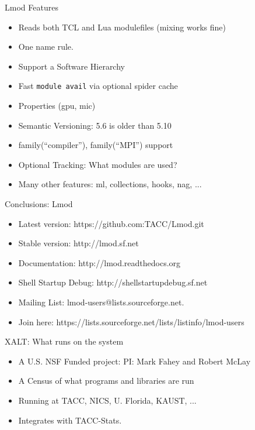 \documentclass{beamer}
\begin{document}
\begin{frame}{Lmod Features}
  \begin{itemize}
    \item Reads both TCL and Lua modulefiles (mixing works fine)
    \item One name rule.
    \item Support a Software Hierarchy
    \item Fast \texttt{module avail} via optional spider cache 
    \item Properties (gpu, mic)
    \item Semantic Versioning:  5.6 is older than 5.10
    \item family(``compiler''), family(``MPI'') support
    \item Optional Tracking: What modules are used?
    \item Many other features: ml, collections, hooks, nag, ...
  \end{itemize}
\end{frame}

\begin{frame}{Conclusions: Lmod}
  \begin{itemize}
    \item Latest version: https://github.com:TACC/Lmod.git
    \item Stable version: http://lmod.sf.net
    \item Documentation:  http://lmod.readthedocs.org
    \item Shell Startup Debug: http://shellstartupdebug.sf.net
    \item Mailing List:   lmod-users@lists.sourceforge.net.
    \item Join here: https://lists.sourceforge.net/lists/listinfo/lmod-users
  \end{itemize}
\end{frame}

\begin{frame}{XALT: What runs on the system}
  \begin{itemize}
    \item A U.S. NSF Funded project: PI: Mark Fahey and Robert McLay
    \item A Census of what programs and libraries are run
    \item Running at TACC, NICS, U. Florida, KAUST, ...
    \item Integrates with TACC-Stats.
  \end{itemize}
\end{frame}
\end{document}
